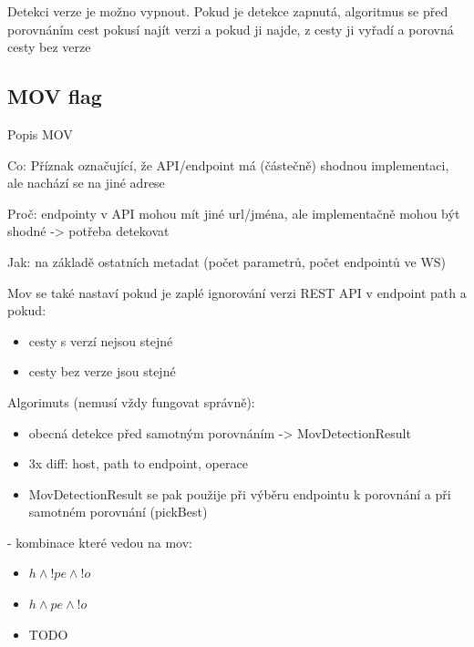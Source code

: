 \documentclass[czech,DP]{thesiskiv}
\begin{document}
Detekci verze je možno vypnout. Pokud je detekce zapnutá, algoritmus se před porovnáním cest pokusí najít verzi a pokud ji najde, z cesty ji vyřadí a porovná cesty bez verze
	
\subsection{MOV flag}	

Popis MOV

Co: Příznak označující, že API/endpoint má (částečně) shodnou implementaci, ale nachází se na jiné adrese

Proč: endpointy v API mohou mít jiné url/jména, ale implementačně mohou být shodné -> potřeba detekovat

Jak: na základě ostatních metadat (počet parametrů, počet endpointů ve WS)

Mov se také nastaví pokud je zaplé ignorování verzi REST API v endpoint path a pokud: 
\begin{itemize}
	\item cesty s verzí nejsou stejné
	\item cesty bez verze jsou stejné
\end{itemize}

Algorimuts (nemusí vždy fungovat správně):
\begin{itemize}
	\item  obecná detekce před samotným porovnáním -> MovDetectionResult
	\item  3x diff: host, path to endpoint, operace
	\item  MovDetectionResult se pak použije při výběru endpointu k porovnání a při samotném porovnání (pickBest)
\end{itemize}
	
- kombinace které vedou na mov: 
\begin{itemize}
	\item $h \land !pe \land !o$
	\item $h \land pe \land !o$
	\item TODO
\end{itemize}
	
	
\end{document}
